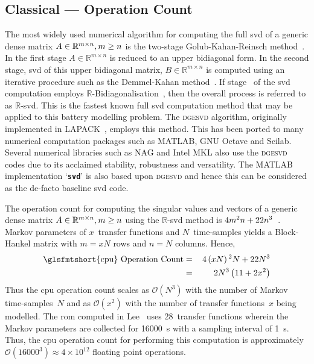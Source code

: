 \subsection{Classical  ---  Operation Count}\label{subsec:Traditional-DRA--CPU}

The most  widely used numerical  algorithm for  computing the full  \gls{svd} of
a  generic  dense  matrix $\mbox{\ensuremath{A\in\mathbb{R}^{m  \times  n},m\geq
n}}$  is  the  two-stage  Golub-Kahan-Reinsch  method~\cite{Golub2013}.  In  the
first  stage $A\in\mathbb{R}^{m  \times n}$  is reduced  to an  upper bidiagonal
form.  In  the  second  stage,   \gls{svd}  of  this  upper  bidiagonal  matrix,
$B\in\mathbb{R}^{m  \times n}$  is computed  using an  iterative procedure  such
as  the Demmel-Kahan  method~\cite{Golub2013}. If  stage~ of  the
\gls{svd}  computation employs  $\mathbb{R}$-Bidiagonalisation~\cite{Golub2013},
then the overall  process is referred to as $\mathbb{R}$-\gls{svd}.  This is the
fastest known  full \gls{svd}  computation method  that may  be applied  to this
battery modelling problem. The \textsc{dgesvd} algorithm, originally implemented
in  \textsc{LAPACK}~\cite{Anderson1999},  employs  this method.  This  has  been
ported to  many numerical computation  packages such  as MATLAB, GNU  Octave and
Scilab.  Several  numerical  libraries  such  as NAG  and  Intel  MKL  also  use
the  \textsc{dgesvd}  codes  due  to its  acclaimed  stability,  robustness  and
versatility.  The MATLAB  implementation `\texttt{\textbf{svd}}'  is also  based
upon \textsc{dgesvd} and  hence this can be considered as  the de-facto baseline
\gls{svd} code.

The    operation    count    for    computing   the    singular    values    and
vectors   of  a   generic   dense  matrix   $\mbox{\ensuremath{A\in\mathbb{R}^{m
\times   n},m\geq    n}}$   using    the   $\mathbb{R}$-\gls{svd}    method   is
$\mbox{\ensuremath{4m^{2}n+22n^{3}}}$~\cite{Golub2013}.  Markov   parameters  of
$x$~transfer functions  and $N$~time-samples  yields a Block-Hankel  matrix with
$m=x N$ rows and $n=N$ columns. Hence,
\begin{alignat}{2}
    \text{\glsfmtshort{cpu} Operation  Count} & = & \,4\left(xN\right){}^{2}N+22N^{3}\nonumber \\
                                              & = & \,2N^{3}\left(11+2x^{2}\right)\label{eq:cpu_op_count}
\end{alignat}
Thus  the \gls{cpu}  operation  count scales  as  $\mathcal{O}(N^{3})$ with  the
number of Markov time-samples~$N$ and as $\mathcal{O}(x^{2})$ with the number of
transfer  functions~$x$ being  modelled. The  \gls{rom} computed  in Lee~\etal{}
uses  28~transfer functions  wherein  the Markov  parameters  are collected  for
\SI{16000}{\second}  with  a sampling  interval  of  \SI{1}{\second}. Thus,  the
\gls{cpu}  operation  count for  performing  this  computation is  approximately
$\mathcal{O}(16000^{3})\approx 4 \times 10^{12}$ floating point operations.

